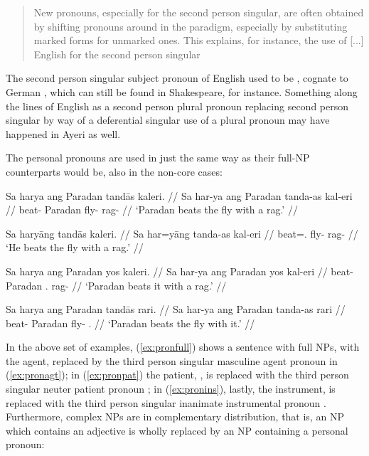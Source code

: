 \blockcquote[42]{lehmann2015}{New pronouns, especially for the second person 
singular, are often obtained by shifting pronouns around in the paradigm, 
especially by substituting marked forms for unmarked ones. This explains, for 
instance, 
the use of [...] English  for the second person singular}

The second person singular subject pronoun of English used to be , 
cognate to German , which can still be found in Shakespeare, for 
instance. Something along the lines of English  as a second 
person plural pronoun replacing second person singular  by way of a 
deferential singular use of a plural pronoun \citep[you, pron., adj., and 
n.]{oed} may have happened in Ayeri as well.

The personal pronouns are used in just the same way as their full-NP 
counterparts would be, also in the non-core cases:

\pex\label{ex:perspro}
\a\label{ex:pronfull}\begingl
	\gla Sa harya ang Paradan tandās kaleri. //
	\glb Sa har-ya ang Paradan tanda-as kal-eri //
	\glc \AgtT{} beat-\TsgM{} \Aarg{} Paradan fly-\Parg{} rag-\Ins{} //
	\glft `Paradan beats the fly with a rag.' //
\endgl

\a\label{ex:pronagt}\begingl
	\gla Sa haryāng tandās kaleri. //
	\glb Sa har=yāng tanda-as kal-eri //
	\glc \AgtT{} beat=\TsgM{}.\Aarg{} fly-\Parg{} rag-\Ins{} //
	\glft `He beats the fly with a rag.' //
\endgl

\a\label{ex:pronpat}\begingl
	\gla Sa harya ang Paradan yos kaleri. //
	\glb Sa har-ya ang Paradan yos kal-eri //
	\glc \AgtT{} beat-\TsgM{} \Aarg{} Paradan \TsgN{}.\Parg{} rag-\Ins{} //
	\glft `Paradan beats it with a rag.' //
\endgl

\a\label{ex:pronins}\begingl
	\gla Sa harya ang Paradan tandās rari. //
	\glb Sa har-ya ang Paradan tanda-as rari //
	\glc \AgtT{} beat-\TsgM{} \Aarg{} Paradan fly-\Parg{} \TsgI{}.\Ins{} //
	\glft `Paradan beats the fly with it.' //
\endgl

\xe

In the above set of examples, (\ref{ex:pronfull}) shows a sentence with full 
NPs, with the agent,  replaced by the third person 
singular masculine agent pronoun  in (\ref{ex:pronagt}); in 
(\ref{ex:pronpat}) the patient, , is replaced with the 
third person singular neuter patient pronoun ; in 
(\ref{ex:pronins}), lastly, the instrument,  is replaced 
with the third person singular inanimate instrumental pronoun .
Furthermore, complex NPs are in complementary distribution, that is, an NP 
which contains an adjective is wholly replaced by an NP containing a 
personal pronoun:

